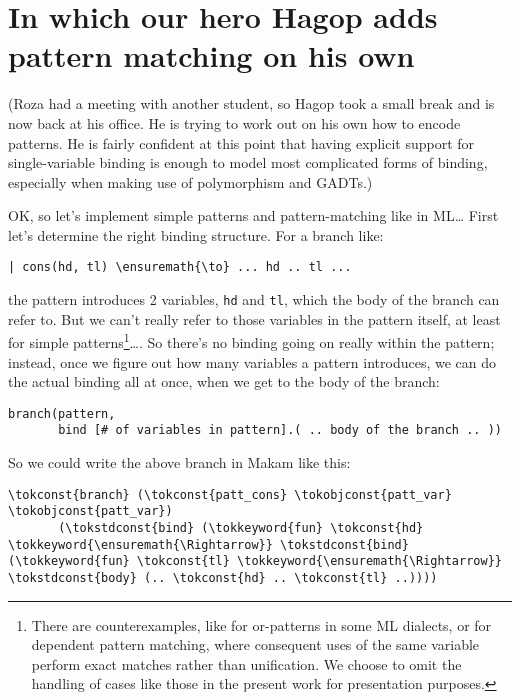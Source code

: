 \section{In which our hero Hagop adds pattern matching on his
own}\label{in-which-our-hero-hagop-adds-pattern-matching-on-his-own}

\begin{scenecomment}
(Roza had a meeting with another student, so Hagop took a small break and is now back at his
office. He is trying to work out on his own how to encode patterns. He is fairly
confident at this point that having explicit support for single-variable
binding is enough to model most complicated forms of binding, especially when making use of
polymorphism and GADTs.)
\end{scenecomment}

\identNormal
\heroSTUDENT{} OK, so let's implement simple patterns and pattern-matching
like in ML\ldots{} First let's determine the right binding structure.
For a branch like:

\begin{verbatim}
| cons(hd, tl) \ensuremath{\to} ... hd .. tl ...
\end{verbatim}

the pattern introduces 2 variables, \texttt{hd} and \texttt{tl}, which
the body of the branch can refer to. But we can't really refer to those
variables in the pattern itself, at least for simple
patterns\footnote{There are counterexamples, like for or-patterns in some ML dialects, or for dependent pattern matching, where consequent uses of the same variable perform exact matches rather than unification. We choose to omit the handling of cases like those in the present work for presentation purposes.}\ldots{}.
So there's no binding going on really within the pattern; instead, once
we figure out how many variables a pattern introduces, we can do the
actual binding all at once, when we get to the body of the branch:

\begin{verbatim}
branch(pattern,
       bind [# of variables in pattern].( .. body of the branch .. ))
\end{verbatim}

So we could write the above branch in Makam like this:

\begin{verbatim}
\tokconst{branch} (\tokconst{patt_cons} \tokobjconst{patt_var} \tokobjconst{patt_var})
       (\tokstdconst{bind} (\tokkeyword{fun} \tokconst{hd} \tokkeyword{\ensuremath{\Rightarrow}} \tokstdconst{bind} (\tokkeyword{fun} \tokconst{tl} \tokkeyword{\ensuremath{\Rightarrow}} \tokstdconst{body} (.. \tokconst{hd} .. \tokconst{tl} ..))))
\end{verbatim}

